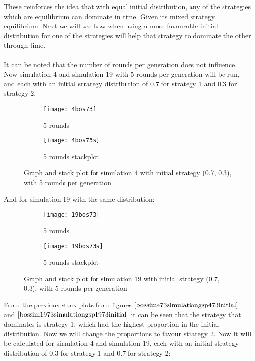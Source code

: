 These reinforces the idea that with equal initial distribution, any of the strategies which are equilibrium can dominate in time. Given its mixed strategy equilibrium. Next we will see how when using a more favourable initial distribution for one of the strategies will help that strategy to dominate the other through time.
\\\\It can be noted that the number of rounds per generation does not influence. Now simulation 4 and simulation 19  with 5 rounds per generation will be run, and each with an initial strategy distribution of 0.7 for strategy 1 and 0.3 for strategy 2.

\begin{figure}[H]       
    \centering
    \begin{subfigure}[b]{0.3\textwidth}
	\centering
	{\texttt{[image: 4bos73]}}   
    	\caption{5 rounds}
	\label{fig:bossim473}
    \end{subfigure}
    \hfill
    \begin{subfigure}[b]{0.3\textwidth}
	\centering
	{\texttt{[image: 4bos73s]}}   
    	\caption{5 rounds stackplot}
	\label{fig:bossim473s}
    \end{subfigure}
    \caption{Graph and stack plot for simulation 4 with initial strategy (0.7, 0.3), with 5 rounds per generation}
    \label{bossim473simulationgsp473initial}
\end{figure}

And for simulation 19 with the same distribution:
\begin{figure}[H]       
    \centering
    \begin{subfigure}[b]{0.3\textwidth}
	\centering
	{\texttt{[image: 19bos73]}}   
    	\caption{5 rounds}
	\label{fig:bossim1973}
    \end{subfigure}
    \hfill
    \begin{subfigure}[b]{0.3\textwidth}
	\centering
	{\texttt{[image: 19bos73s]}}   
    	\caption{5 rounds stackplot}
	\label{fig:bossim1973s}
    \end{subfigure}
    \caption{Graph and stack plot for simulation 19 with initial strategy (0.7, 0.3), with 5 rounds per generation}
    \label{bossim1973simulationgsp1973initial}
\end{figure}
From the previous stack plots from figures $\ref{bossim473simulationgsp473initial}$ and $\ref{bossim1973simulationgsp1973initial}$ it can be seen that the strategy that dominates is strategy 1, which had the highest proportion in the initial distribution. Now we will change the proportions to favour strategy 2.
Now it will be calculated for simulation 4 and simulation 19, each with an initial strategy distribution of 0.3 for strategy 1 and 0.7 for strategy 2:

